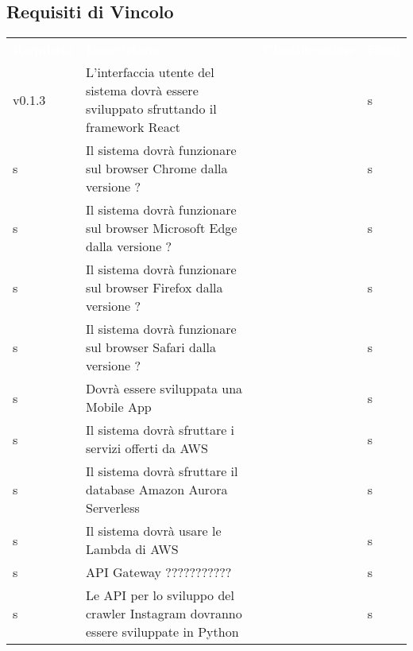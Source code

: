 \subsection{Requisiti di Vincolo}


\renewcommand{\arraystretch}{1.5}
\begin{longtable}{ m{}<{\centering}  m{}<{\centering}  m{}<{\centering}  m{}<{\centering}}
	\rowcolor{darkblue}
	\textcolor{white}{\textbf{Requisito}} &\textcolor{white}{\textbf{Descrizione}}& \textcolor{white}{\textbf{Classificazione}} & \textcolor{white}{\textbf{Fonti}}\\ 

	 v0.1.3 & L’interfaccia utente del sistema dovrà essere sviluppato sfruttando il framework React & \Ob & s\\	

	\rowcolor{gray!25} s & Il sistema dovrà funzionare sul browser Chrome dalla versione ? & \Ob & s\\	
	 
	 s & Il sistema dovrà funzionare sul browser Microsoft Edge dalla versione ? & \Ob & s\\	

	\rowcolor{gray!25} s & Il sistema dovrà funzionare sul browser Firefox dalla versione ? & \Ob & s\\	
	 
	 s & Il sistema dovrà funzionare sul browser Safari dalla versione ? & \Ob & s\\	
	 
	\rowcolor{gray!25} s & Dovrà essere sviluppata una Mobile App & \Fa & s\\	
	 
	 s & Il sistema dovrà sfruttare i servizi offerti da AWS & \Ob & s\\	
	 
	\rowcolor{gray!25} s & Il sistema dovrà sfruttare il database Amazon Aurora Serverless & \De & s\\
	
	 s & Il sistema dovrà usare le Lambda di AWS & \Ob & s\\	
	 
	\rowcolor{gray!25} s & API Gateway ??????????? & \De & s\\	 

	 s & Le API per lo sviluppo del crawler Instagram dovranno essere sviluppate in Python & \De & s\\	
	 

\end{longtable}
